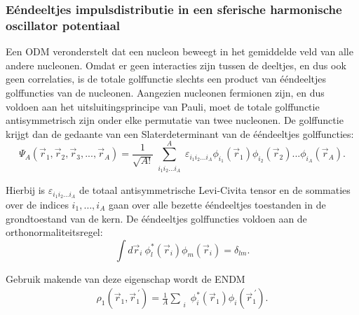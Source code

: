 \documentclass[11pt,twoside]{book}
\begin{document}
\subsubsection{E\'{e}ndeeltjes impulsdistributie in een sferische harmonische oscillator potentiaal}
Een ODM veronderstelt dat een nucleon beweegt in het gemiddelde veld van alle andere nucleonen. Omdat er geen interacties zijn tussen de deeltjes, en dus ook geen correlaties, is de totale golffunctie slechts een product van \'{e}\'{e}ndeeltjes golffuncties van de nucleonen. Aangezien nucleonen fermionen zijn, en dus voldoen aan het uitsluitingsprincipe van Pauli, moet de totale golffunctie antisymmetrisch zijn onder elke permutatie van twee nucleonen. De golffunctie krijgt dan de gedaante van een Slaterdeterminant van de \'{e}\'{e}ndeeltjes golffuncties:
\begin{equation} \label{eq:slater}
\Psi_A(\vec{r}_1,\vec{r}_2,\vec{r}_3, ... ,\vec{r}_A)= \frac{1}{\sqrt{A!}} \sum^A_{\substack{i_1 i_2 \ldots i_A}} 
													  \varepsilon_{i_1 i_2 \ldots i_A} \phi_{i_1}(\vec{r}_1)
													         \phi_{i_2}(\vec{r}_2)...
													         \phi_{i_A}(\vec{r}_A).
\end{equation}

Hierbij is $\varepsilon_{i_1 i_2 \ldots i_A}$ de totaal antisymmetrische Levi-Civita tensor en de sommaties over de indices $i_1,\ldots ,i_A$  gaan over alle bezette \'{e}\'{e}ndeeltjes toestanden in de grondtoestand van de kern. De \'{e}\'{e}ndeeltjes golffuncties voldoen aan de orthonormaliteitsregel:
\begin{equation} \label{eq:orthogonality}
\int d\vec{r}_i\  \phi^*_l(\vec{r}_i)\phi_m(\vec{r}_i) = \delta_{lm}.
\end{equation}

Gebruik makende van deze eigenschap wordt de ENDM 
\begin{align} \label{eq:1pmd}
\rho_1(\vec{r}_1,\vec{r}^{\ \prime}_1) = \frac{1}{A}\sum_{\substack{i}} \phi^*_i(\vec{r}_1) \phi_i(\vec{r}_1^{\ \prime}).
\end{align}
\end{document}
